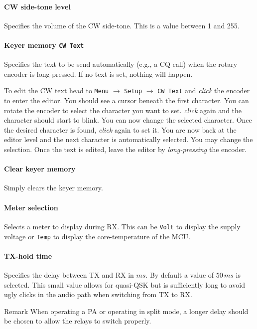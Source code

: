 \documentclass[10pt, a4paper]{scrartcl}
\newenvironment{remark}{\begin{bclogo}[couleur=blue!30,arrondi=.1,logo=\bcinfo,ombre=true]{Remark}}{\end{bclogo}}
\begin{document}
\paragraph{CW side-tone level}
Specifies the volume of the CW side-tone. This is a value between 1 and 255.

\paragraph{Keyer memory \texttt{CW Text}}
Specifies the text to be send automatically (e.g., a CQ call) when the rotary encoder is long-pressed. If no text is set, nothing will happen.

To edit the CW text head to \texttt{Menu} $\rightarrow$ \texttt{Setup} $\rightarrow$ \texttt{CW Text} and \emph{click} the encoder to enter the editor. You should see a cursor beneath the first character. You can rotate the encoder to select the character you want to set. \emph{click} again and the character should start to blink. You can now change the selected character. Once the desired character is found, \emph{click} again to set it. You are now back at the editor level and the next character is automatically selected. You may change the selection. Once the text is edited, leave the editor by \emph{long-pressing} the encoder.

\paragraph{Clear keyer memory}
Simply clears the keyer memory.

\paragraph{Meter selection}
Selects a meter to display during RX. This can be \texttt{Volt} to display the supply voltage or \texttt{Temp} to display the core-temperature of the MCU.

\paragraph{TX-hold time}
Specifies the delay between TX and RX in $ms$. By default a value of $50\,ms$ is selected. This small value allows for quasi-QSK but is sufficiently long to avoid ugly clicks in the audio path when switching from TX to RX.
\begin{remark}
When operating a PA or operating in split mode, a longer delay should be chosen to allow the relays to switch properly.
\end{remark}
\end{document}
